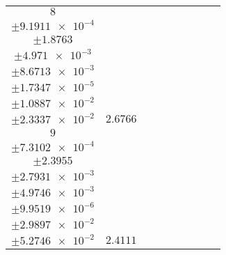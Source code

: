 \documentclass[8pt]{article}
\begin{document}
\begin{longtable}[l]{c c c c c c c c c}
$\num{8}$ & \begin{tabular}[c]{@{}c@{}}$\num{3.2144e-2}$ \\ $\pm\num{9.1911e-4}$\end{tabular} & \begin{tabular}[c]{@{}c@{}}$\num{6.9645e-2}$ \\ $\pm\num{1.8763}$\end{tabular} & \begin{tabular}[c]{@{}c@{}}$\num{-7.0885}$ \\ $\pm\num{4.971e-3}$\end{tabular} & \begin{tabular}[c]{@{}c@{}}$\num{1.4313e+3}$ \\ $\pm\num{8.6713e-3}$\end{tabular} & \begin{tabular}[c]{@{}c@{}}$\num{2.8633}$ \\ $\pm\num{1.7347e-5}$\end{tabular} & \begin{tabular}[c]{@{}c@{}}$\num{1.2218}$ \\ $\pm\num{1.0887e-2}$\end{tabular} & \begin{tabular}[c]{@{}c@{}}$\num{4.1614}$ \\ $\pm\num{2.3337e-2}$\end{tabular} & $\num{2.6766}$\\
$\num{9}$ & \begin{tabular}[c]{@{}c@{}}$\num{2.7601e-2}$ \\ $\pm\num{7.3102e-4}$\end{tabular} & \begin{tabular}[c]{@{}c@{}}$\num{3.5213e-2}$ \\ $\pm\num{2.3955}$\end{tabular} & \begin{tabular}[c]{@{}c@{}}$\num{-6.8021}$ \\ $\pm\num{2.7931e-3}$\end{tabular} & \begin{tabular}[c]{@{}c@{}}$\num{1.4317e+3}$ \\ $\pm\num{4.9746e-3}$\end{tabular} & \begin{tabular}[c]{@{}c@{}}$\num{2.8642}$ \\ $\pm\num{9.9519e-6}$\end{tabular} & \begin{tabular}[c]{@{}c@{}}$\num{1.1314}$ \\ $\pm\num{2.9897e-2}$\end{tabular} & \begin{tabular}[c]{@{}c@{}}$\num{4.0476}$ \\ $\pm\num{5.2746e-2}$\end{tabular} & $\num{2.4111}$\\

\end{longtable}
\end{document}
